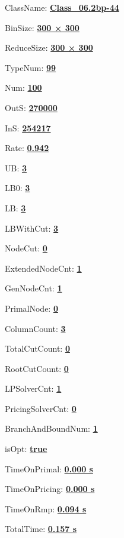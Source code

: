\documentclass[11pt]{article}
\begin{document}
\pagestyle{empty}


ClassName: \underline{\textbf{Class_06.2bp-44}}
\par
BinSize: \underline{\textbf{300 × 300}}
\par
ReduceSize: \underline{\textbf{300 × 300}}
\par
TypeNum: \underline{\textbf{99}}
\par
Num: \underline{\textbf{100}}
\par
OutS: \underline{\textbf{270000}}
\par
InS: \underline{\textbf{254217}}
\par
Rate: \underline{\textbf{0.942}}
\par
UB: \underline{\textbf{3}}
\par
LB0: \underline{\textbf{3}}
\par
LB: \underline{\textbf{3}}
\par
LBWithCut: \underline{\textbf{3}}
\par
NodeCut: \underline{\textbf{0}}
\par
ExtendedNodeCnt: \underline{\textbf{1}}
\par
GenNodeCnt: \underline{\textbf{1}}
\par
PrimalNode: \underline{\textbf{0}}
\par
ColumnCount: \underline{\textbf{3}}
\par
TotalCutCount: \underline{\textbf{0}}
\par
RootCutCount: \underline{\textbf{0}}
\par
LPSolverCnt: \underline{\textbf{1}}
\par
PricingSolverCnt: \underline{\textbf{0}}
\par
BranchAndBoundNum: \underline{\textbf{1}}
\par
isOpt: \underline{\textbf{true}}
\par
TimeOnPrimal: \underline{\textbf{0.000 s}}
\par
TimeOnPricing: \underline{\textbf{0.000 s}}
\par
TimeOnRmp: \underline{\textbf{0.094 s}}
\par
TotalTime: \underline{\textbf{0.157 s}}
\par
\newpage
\end{document}
